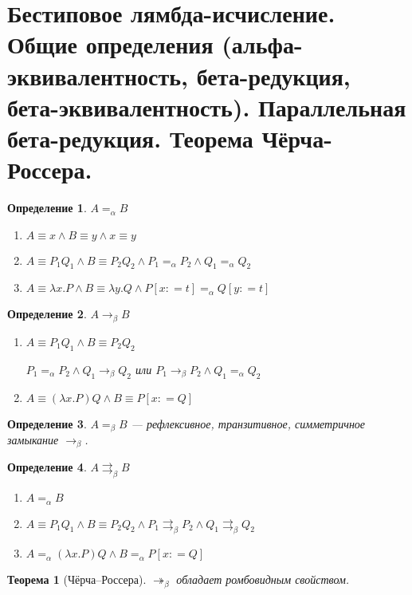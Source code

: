 \documentclass[10pt,a4paper,oneside]{article}
\theoremstyle{plain}
\newtheorem*{theorem}{Теорема}
\theoremstyle{defenition}
\newtheorem*{defenition}{Определение}
\begin{document}
\section{Бестиповое лямбда-исчисление. Общие определения (альфа-эквивалентность, бета-редукция, бета-эквивалентность). Параллельная бета-редукция. Теорема Чёрча-Россера.}
\begin{defenition}
	$A=_{\alpha}B$
	\begin{enumerate}
		\item $A\equiv x \wedge B\equiv y \wedge x\equiv y$
		\item $A\equiv P_1 Q_1 \wedge B\equiv P_2 Q_2 \wedge P_1=_{\alpha}P_2 \wedge Q_1=_{\alpha}Q_2$
		\item $A\equiv\lambda x.P \wedge B\equiv\lambda y.Q \wedge P[x\colon=t]=_{\alpha}Q[y\colon=t]$
	\end{enumerate}
\end{defenition}

\begin{defenition}
	$A\to_{\beta}B$
	\begin{enumerate}
		\item $A\equiv P_1 Q_1 \wedge B\equiv P_2 Q_2$
		
		      $P_1=_{\alpha}P_2 \wedge Q_1\to_{\beta}Q_2$
		      или
		      $P_1\to_{\beta}P_2 \wedge Q_1=_{\alpha}Q_2$
		\item $A\equiv(\lambda x.P) Q \wedge B\equiv P[x\colon=Q]$
	\end{enumerate}
\end{defenition}

\begin{defenition}
	$A=_{\beta}B$ --- рефлексивное, транзитивное, симметричное замыкание $\to_{\beta}$.
\end{defenition}

\begin{defenition}
	$A\rightrightarrows_{\beta}B$
	\begin{enumerate}
		\item $A=_{\alpha}B$
		\item $A\equiv P_1 Q_1 \wedge B\equiv P_2 Q_2 \wedge P_1\rightrightarrows_{\beta}P_2 \wedge Q_1\rightrightarrows_{\beta}Q_2$
		\item $A=_{\alpha}(\lambda x.P) Q \wedge B=_{\alpha}P[x\colon=Q]$
	\end{enumerate}
\end{defenition}

\begin{theorem}[Чёрча--Россера]
	$\twoheadrightarrow_{\beta}$ обладает ромбовидным свойством.
\end{theorem}
\end{document}
